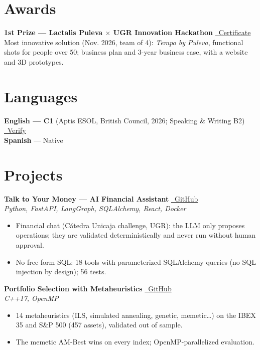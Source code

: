 \documentclass[12pt,a4paper]{article}
\begin{document}
\section{Awards}
\textbf{1st Prize --- Lactalis Puleva $\times$ UGR Innovation Hackathon} \hfill \href{https://joseangelcarretero.dev/certificado-hackathon-puleva.pdf}{\faCheckCircle\ Certificate} \\
Most innovative solution (Nov. 2026, team of 4): \textit{Tempo by Puleva}, functional shots for people over 50; business plan and 3-year business case, with a website and 3D prototypes.

\section{Languages}
\textbf{English --- C1} (Aptis ESOL, British Council, 2026; Speaking \& Writing B2) \hfill \href{https://credentials.britishcouncil.org/28379ba7-48f4-48de-9bec-4a27901aebc4?key=904660ccf4df4f33d680e802a8130aace31f119fae33bb6c3fc9628da4798365}{\faCheckCircle\ Verify} \\
\textbf{Spanish} --- Native

\section{Projects}

\textbf{Talk to Your Money --- AI Financial Assistant} \hfill \href{https://github.com/0xjoseangel/reto-unicaja}{\faGithub\ GitHub} \\
\textit{Python, FastAPI, LangGraph, SQLAlchemy, React, Docker}
\begin{itemize}[leftmargin=1.2em,itemsep=1pt,topsep=2pt,parsep=0pt]
  \item Financial chat (Cátedra Unicaja challenge, UGR): the LLM only proposes operations; they are validated deterministically and never run without human approval.
  \item No free-form SQL: 18 tools with parameterized SQLAlchemy queries (no SQL injection by design); 56 tests.
\end{itemize}

\vspace{3pt}

\textbf{Portfolio Selection with Metaheuristics} \hfill \href{https://github.com/0xjoseangel/portfolio}{\faGithub\ GitHub} \\
\textit{C++17, OpenMP}
\begin{itemize}[leftmargin=1.2em,itemsep=1pt,topsep=2pt,parsep=0pt]
  \item 14 metaheuristics (ILS, simulated annealing, genetic, memetic\ldots) on the IBEX 35 and S\&P 500 (457 assets), validated out of sample.
  \item The memetic AM-Best wins on every index; OpenMP-parallelized evaluation.
\end{itemize}
\end{document}
